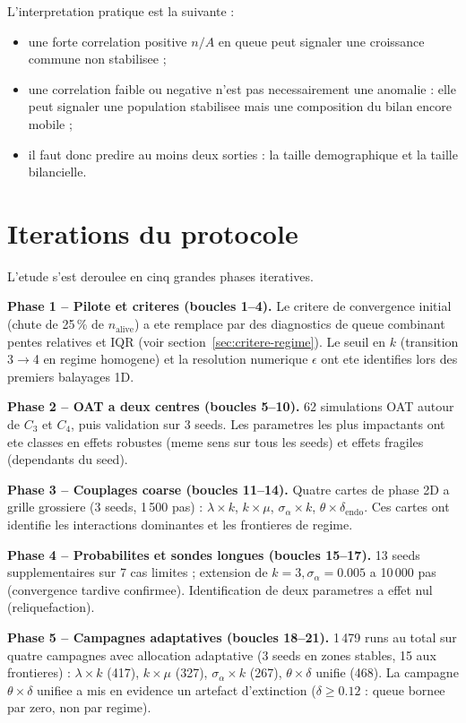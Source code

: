 \documentclass[11pt,a4paper]{article}
\begin{document}
L'interpretation pratique est la suivante :
\begin{itemize}
  \item une forte correlation positive \(n/A\) en queue peut signaler une
  croissance commune non stabilisee ;
  \item une correlation faible ou negative n'est pas necessairement une
  anomalie : elle peut signaler une population stabilisee mais une composition
  du bilan encore mobile ;
  \item il faut donc predire au moins deux sorties : la taille demographique et
  la taille bilancielle.
\end{itemize}

\section{Iterations du protocole}

L'etude s'est deroulee en cinq grandes phases iteratives.

\textbf{Phase 1 -- Pilote et criteres (boucles 1--4).}
Le critere de convergence initial (chute de 25\,\% de \(n_{\mathrm{alive}}\))
a ete remplace par des diagnostics de queue combinant pentes relatives et
IQR (voir section~\ref{sec:critere-regime}). Le seuil en \(k\) (transition
3$\to$4 en regime homogene) et la resolution numerique \(\epsilon\) ont ete
identifies lors des premiers balayages 1D.

\textbf{Phase 2 -- OAT a deux centres (boucles 5--10).}
62 simulations OAT autour de $C_3$ et $C_4$, puis validation sur 3 seeds.
Les parametres les plus impactants ont ete classes en effets robustes
(meme sens sur tous les seeds) et effets fragiles (dependants du seed).

\textbf{Phase 3 -- Couplages coarse (boucles 11--14).}
Quatre cartes de phase 2D a grille grossiere (3 seeds, 1\,500 pas) :
\(\lambda\times k\), \(k\times\mu\), \(\sigma_\alpha\times k\),
\(\theta\times\delta_{\mathrm{endo}}\). Ces cartes ont identifie les
interactions dominantes et les frontieres de regime.

\textbf{Phase 4 -- Probabilites et sondes longues (boucles 15--17).}
13 seeds supplementaires sur 7 cas limites ; extension de
$k=3,\sigma_\alpha=0.005$ a 10\,000 pas (convergence tardive confirmee).
Identification de deux parametres a effet nul (reliquefaction).

\textbf{Phase 5 -- Campagnes adaptatives (boucles 18--21).}
1\,479 runs au total sur quatre campagnes avec allocation adaptative
(3 seeds en zones stables, 15 aux frontieres) :
\(\lambda\times k\) (417), \(k\times\mu\) (327),
\(\sigma_\alpha\times k\) (267), \(\theta\times\delta\) unifie (468).
La campagne \(\theta\times\delta\) unifiee a mis en evidence un artefact
d'extinction (\(\delta\ge0.12\) : queue bornee par zero, non par regime).
\end{document}
